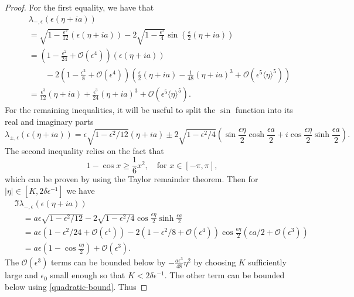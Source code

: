 \begin{proof}
	For the first equality, we have that 
	\begin{align*}
		&\lambda_{-,\epsilon} (\epsilon(\eta + ia))  \\
		\quad&= \sqrt{1-\frac{\epsilon^2}{12}} (\epsilon(\eta + ia)) - 2 \sqrt{1 - \frac{\epsilon^2} 4}\sin\left(\frac \epsilon 2 (\eta + ia ) \right) \\
		\quad&=\left( 1 - \frac{\epsilon^2}{24} +\mathcal O(\epsilon^4) \right) (\epsilon(\eta + ia )) \\
		&\qquad - 2 \left( 1 - \frac{\epsilon^2} 8 + \mathcal O(\epsilon^4) \right) \left( \frac\epsilon 2 (\eta+ i a) - \frac 1 {48}  (\eta + ia)^3 + \mathcal O(\epsilon^5\langle\eta \rangle^5)\right) \\
		\quad&= \frac {\epsilon^3} {12} (\eta + ia) + \frac{\epsilon^3}{24}(\eta + ia)^3 + \mathcal O(\epsilon^5 \langle \eta\rangle^5).
	\end{align*}
	For the remaining inequalities, it will be useful to split the \(\sin\) function into its real and imaginary parts
	\begin{equation}
		\lambda_{\pm,\epsilon}(\epsilon (\eta + ia)) = \epsilon \sqrt{1-\epsilon^2/12}(\eta+ia) \pm 2 \sqrt{1-\epsilon^2/4} \left(\sin \frac{\epsilon \eta}{2} \cosh\frac{\epsilon a}{2} + i\cos \frac{\epsilon \eta}{2} \sinh \frac{\epsilon a}{2}\right).
	\end{equation}
	The second inequality relies on the fact that 
	\begin{equation}\label{quadratic-bound}
		1- \cos x  \geq  \frac 1  6 x^2, \quad \text{for } x\in[-\pi, \pi],
	\end{equation}
	which can be proven by using the Taylor remainder theorem. Then for \(|\eta|\in [K,2\delta \epsilon^{-1}] \) we have
	\begin{align*}
		&\Im \lambda_{-,\epsilon}(\epsilon(\eta + ia))\\
		&\quad= a\epsilon \sqrt{1-\epsilon^2/12} - 2 \sqrt{1-\epsilon^2/4} \cos\frac{\epsilon\eta} 2 \sinh \frac{\epsilon a} 2 \\
		&\quad= a\epsilon (1 - \epsilon^2/24 + \mathcal{O}(\epsilon^4))- 2 (1 - \epsilon^2/8 + \mathcal{O}(\epsilon^4)) \cos\frac{\epsilon\eta} 2 (\epsilon a/2 + \mathcal O(\epsilon^3))\\
		&\quad= a \epsilon (1- \cos \frac{\epsilon \eta} 2 ) + \mathcal O(\epsilon^3).
	\end{align*}
	The \(\mathcal O(\epsilon ^3)\) terms can be bounded below by \(-\frac{a\epsilon^3}{48}\eta^2\) by choosing \(K\) sufficiently large and \(\epsilon_0\) small enough so that \(K < 2\delta \epsilon^{-1}\). The other term can be bounded below using \cref{quadratic-bound}. Thus

\end{proof}
